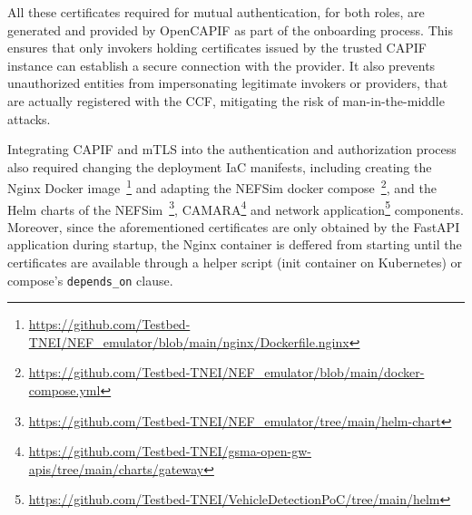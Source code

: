 All these certificates required for mutual authentication, for both roles, are generated and provided by Open\acs{CAPIF} as part of the onboarding process. This ensures that only invokers holding certificates issued by the trusted \acs{CAPIF} instance can establish a secure connection with the provider. It also prevents unauthorized entities from impersonating legitimate invokers or providers, that are actually registered with the \acs{CCF}, mitigating the risk of man-in-the-middle attacks.

Integrating \acs{CAPIF} and \acs{mTLS} into the authentication and authorization process also required changing the deployment \acs{IaC} manifests, including creating the Nginx Docker image~\footnote{\url{https://github.com/Testbed-TNEI/NEF_emulator/blob/main/nginx/Dockerfile.nginx}} and adapting the \acs{NEF}Sim docker compose~\footnote{\url{https://github.com/Testbed-TNEI/NEF_emulator/blob/main/docker-compose.yml}}, and the Helm charts of the \acs{NEF}Sim~\footnote{\url{https://github.com/Testbed-TNEI/NEF_emulator/tree/main/helm-chart}}, CAMARA\footnote{\url{https://github.com/Testbed-TNEI/gsma-open-gw-apis/tree/main/charts/gateway}} and network application\footnote{\url{https://github.com/Testbed-TNEI/VehicleDetectionPoC/tree/main/helm}} components. Moreover, since the aforementioned certificates are only obtained by the Fast\acs{API} application during startup, the Nginx container is deffered from starting until the certificates are available through a helper script (init container on Kubernetes) or compose's \texttt{depends\_on} clause.
